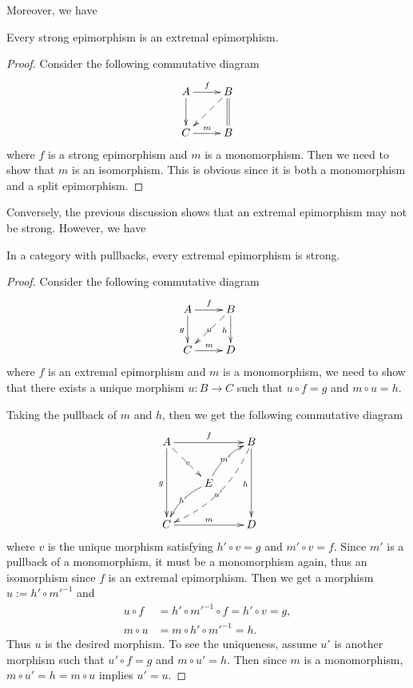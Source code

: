   Moreover, we have
  \begin{prop}
    Every strong epimorphism is an extremal epimorphism.
  \end{prop}
  \begin{proof}
    Consider the following commutative diagram
        \begin{displaymath}
          \xymatrix{
            A\ar[r]^{f}\ar[d]&B\ar@{=}[d]\ar@{-->}[dl]\\
            C\ar[r]^{m}&B
          }
        \end{displaymath}
    where $f$ is a strong epimorphism and $m$ is a monomorphism. Then we need to show that $m$ is an isomorphism. This is obvious since it is both a monomorphism and a split epimorphism.
  \end{proof}
  Conversely, the previous discussion shows that an extremal epimorphism may not be strong. However, we have
  \begin{prop}\label{prop:extremal=strong}
    In a category with pullbacks, every extremal epimorphism is strong.
  \end{prop}
  \begin{proof}
    Consider the following commutative diagram
        \begin{displaymath}
          \xymatrix{
            A\ar[r]^{f}\ar[d]_{g}&B\ar[d]_{h}\ar@{-->}[dl]|{u}\\
            C\ar[r]^{m}&D
          }
        \end{displaymath}
    where $f$ is an extremal epimorphism and $m$ is a monomorphism, we need to show that there exists a unique morphism $u\colon B\to C$ such that $u\circ f = g$ and $m\circ u = h$.

    Taking the pullback of $m$ and $h$, then we get the following commutative diagram
        \begin{displaymath}
          \xymatrix{
            A\ar[rr]^{f}\ar[dd]_{g}\ar@{-->}[dr]|{v}&&B\ar[dd]_{h}\ar@/^1pc/@{-->}[ddll]|{u'}\\
            &E\ar@/_/[dl]|{h'}\ar@/^/[ur]|{m'}&\\
            C\ar[rr]^{m}&&D
          }
        \end{displaymath}
    where $v$ is the unique morphism satisfying $h'\circ v=g$ and $m'\circ v=f$. Since $m'$ is a pullback of a monomorphism, it must be a monomorphism again, thus an isomorphism since $f$ is an extremal epimorphism. Then we get a morphism $u:=h'\circ{m'}^{-1}$ and
    \begin{align*}
      u\circ f &= h'\circ{m'}^{-1}\circ f = h'\circ v = g,\\
      m\circ u &= m\circ h'\circ{m'}^{-1} = h.
    \end{align*}
    Thus $u$ is the desired morphism. To see the uniqueness, assume $u'$ is another morphism such that $u'\circ f = g$ and $m\circ u' = h$. Then since $m$ is a monomorphism, $m\circ u' = h = m\circ u$ implies $u'=u$.
  \end{proof}

